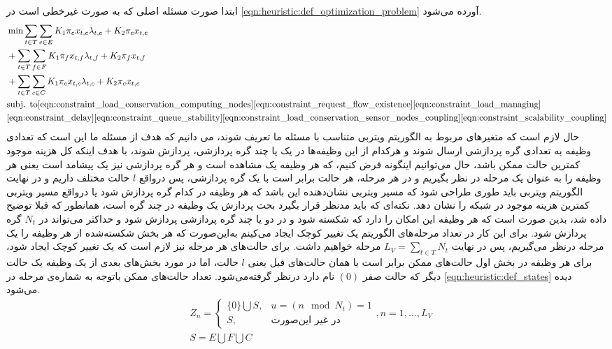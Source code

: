 	ابتدا صورت مسئله اصلی که به صورت غیرخطی است در \cref{eqn:heuristic:def_optimization_problem} آورده می‌شود. 
	\begin{align}\label{eqn:heuristic:def_optimization_problem}
		& \min \sum_{t \in T}\sum_{e \in E} K_1\pi_ex_{t,e}\lambda_{t,e} + K_2\pi_ex_{t,e} \notag \\
		& + \sum_{t \in T}\sum_{f \in F} K_1\pi_fx_{t,f}\lambda_{t,f} + K_2\pi_fx_{t,f} \notag \\
		& + \sum_{t \in T}\sum_{c \in C} K_1\pi_cx_{t,c}\lambda_{t,c} + K_2\pi_cx_{t,c} \notag \\
		&\text{subj. to}  %
		\cref{eqn:constraint_load_conservation_computing_nodes}
		\cref{eqn:constraint_request_flow_existence}
		\cref{eqn:constraint_load_managing}\notag \\
		&\cref{eqn:constraint_delay}
		\cref{eqn:constraint_queue_stability}
		\cref{eqn:constraint_load_conservation_sensor_nodes_coupling}
		\cref{eqn:constraint_scalability_coupling}
	\end{align}
	حال لازم است که متغیرهای مربوط به الگوریتم ویتربی متناسب با مسئله‌ ما تعریف شوند، می دانیم که هدف از مسئله ما این است که تعدادی وظیفه به تعدادی گره پردازشی ارسال شوند و هرکدام از این وظیفه‌ها در یک یا چند گره پردازشی، پردازش شوند، با هدف اینکه کل هزینه موجود کمترین حالت ممکن باشد، حال می‌توانیم اینگونه فرض کنیم، که هر وظیفه یک مشاهده است و هر گره پردازشی نیز یک پیشامد است یعنی هر وظیفه را به عنوان یک مرحله در نظر بگیریم و در هر مرحله، هر حالت برابر است با یک گره پردازشی، پس درواقع $l$ حالت مختلف داریم و در نهایت الگوریتم ویتربی باید طوری طراحی شود که مسیر ویتربی نشان‌دهنده این باشد که هر وظیفه در کدام گره پردازش شود یا درواقع مسیر ویتربی کمترین هزینه موجود در شبکه را نشان دهد.
	نکته‌ای که باید مدنظر قرار بگیرد بحث پردازش یک وظیفه در چند گره است، همانطور که قبلا توضیح داده شد، بدین صورت است که هر وظیفه این امکان را دارد که شکسته شود و در دو یا چند گره پردازشی پردازش شود و حداکثر می‌تواند در $N_t$ گره پردازش شود. 
	برای این کار در تعداد مرحله‌های الگوریتم یک تغییر کوچک ایجاد می‌کینم به‌این‌صورت که هر بخش شکسته‌شده از هر وظیفه را یک مرحله درنظر می‌گیریم، پس در نهایت $ \displaystyle L_V=\sum_{t \in T} N_t$ مرحله خواهیم داشت. 
	برای حالت‌های هر مرحله نیز لازم است که یک تغییر کوچک ایجاد شود، برای هر وظیفه در بخش اول حالت‌های ممکن برابر است با همان حالت‌های قبل یعنی $l$ حالت، اما در مورد بخش‌های بعدی از یک وظیفه یک حالت دیگر که حالت صفر $(0)$ نام دارد درنظر گرفته‌می‌شود. تعداد حالت‌های ممکن باتوجه به شماره‌ی مرحله در \cref{eqn:heuristic:def_states} دیده می‌شود. 
	\begin{subequations}\label{eqn:heuristic:def_states}
		\begin{align}
			&Z_n =
			\begin{cases}
			\{0\} \bigcup S, & \text{$u = (n \mod N_t) = 1$} \\
			S,               & \text{در غیر این‌صورت}
			\end{cases}
			,n = 1, \dots, L_V \\
			&S = E \bigcup F \bigcup C
		\end{align}
	\end{subequations}
